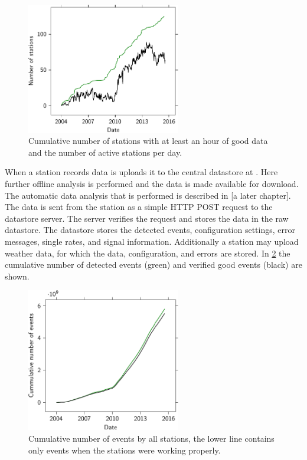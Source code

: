 \begin{figure}
    \centering
    \includegraphics[width=0.6\textwidth]
                    {plots/cluster/active_stations}
    \caption{Cumulative number of stations with at least an hour of good data and the number of active stations per day.}
    \label{fig:active_stations}
\end{figure}

When a station records data is uploads it to the central datastore at \nikhef. Here further offline analysis is performed and the data is made available for download. The automatic data analysis that is performed is described in [a later chapter]. The data is sent from the station as a simple HTTP POST request to the datastore server. The server verifies the request and stores the data in the raw datastore. The datastore stores the detected events, configuration settings, error messages, single rates, and \gps signal information. Additionally a station may upload weather data, for which the data, configuration, and errors are stored. In \cref{fig:luminosity_network} the cumulative number of detected events (green) and verified good events (black) are shown.

\begin{figure}
    \centering
    \includegraphics[width=0.6\textwidth]
                    {plots/cluster/luminosity_network}
    \caption{Cumulative number of events by all stations, the lower line contains only events when the stations were working properly.}
    \label{fig:luminosity_network}
\end{figure}

